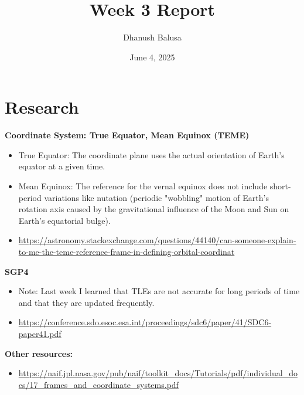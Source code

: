 \documentclass[12pt]{report}
\title{Week 3 Report}
\author{Dhanush Balusa}
\date{June 4, 2025}
\begin{document}
\maketitle

\chapter*{Research}

\textbf{Coordinate System: True Equator, Mean Equinox (TEME)}
\begin{itemize}
  \item True Equator: The coordinate plane uses the actual orientation of Earth’s equator at a given time.
  \item Mean Equinox: The reference for the vernal equinox does not include short-period variations like nutation (periodic "wobbling" motion of Earth's rotation axis caused by the gravitational influence of the Moon and Sun on Earth's equatorial bulge).
  \item \url{https://astronomy.stackexchange.com/questions/44140/can-someone-explain-to-me-the-teme-reference-frame-in-defining-orbital-coordinat}
\end{itemize}

\textbf{SGP4}
\begin{itemize}
  \item Note: Last week I learned that TLEs are not accurate for long periods of time and that they are updated frequently.
  \item \url{https://conference.sdo.esoc.esa.int/proceedings/sdc6/paper/41/SDC6-paper41.pdf}
\end{itemize}

\textbf{Other resources:}
\begin{itemize}
  \item \url{https://naif.jpl.nasa.gov/pub/naif/toolkit_docs/Tutorials/pdf/individual_docs/17_frames_and_coordinate_systems.pdf}
\end{itemize}
\end{document}

